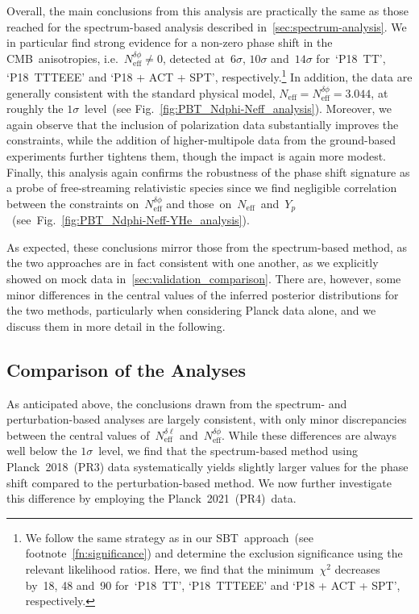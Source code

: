 \documentclass[11pt]{article}
\numberwithin{equation}{section}
\newcommand{\Neff}{N_\mathrm{eff}}
\newcommand{\Nphase}{N_\mathrm{eff}^{\delta\phi}}
\newcommand{\Nmultipole}{N_\mathrm{eff}^{\delta\ell}}
\begin{document}
Overall, the main conclusions from this analysis are practically the same as those reached for the spectrum-based analysis described in~\textsection\ref{sec:spectrum-analysis}. We in particular find strong evidence for a non-zero phase shift in the CMB~anisotropies, i.e.\ $\Nphase \neq 0$, detected at~$6\sigma$, $10\sigma$ and~$14\sigma$ for~`P18~TT', `P18~TTTEEE' and `P18 + ACT + SPT', respectively.\footnote{We follow the same strategy as in our SBT~approach~(see footnote~\ref{fn:significance}) and determine the exclusion significance using the relevant likelihood ratios. Here, we find that the minimum~$\chi^2$ decreases by~18, 48 and~90 for~`P18~TT', `P18~TTTEEE' and `P18 + ACT + SPT', respectively.} In addition, the data are generally consistent with the standard physical model, $\Neff = \Nphase = 3.044$, at roughly the $1\sigma$~level~(see Fig.~\ref{fig:PBT_Ndphi-Neff_analysis}). Moreover, we again observe that the inclusion of polarization data substantially improves the constraints, while the addition of higher-multipole data from the ground-based experiments further tightens them, though the impact is again more modest. Finally, this analysis again confirms the robustness of the phase shift signature as a probe of free-streaming relativistic species since we find negligible correlation between the constraints on~$\Nphase$ and \mbox{those on~$\Neff$ and~$Y_p$~(see Fig.~\ref{fig:PBT_Ndphi-Neff-YHe_analysis}).}

As expected, these conclusions mirror those from the spectrum-based method, as the two approaches are in fact consistent with one another, as we explicitly showed on mock data in~\textsection\ref{sec:validation_comparison}. There are, however, some minor differences in the central values of the inferred posterior distributions for the two methods, particularly when considering Planck data alone, and we discuss them in more detail in the following.


\subsection{Comparison of the Analyses}
\label{sec:comparison-data}

As anticipated above, the conclusions drawn from the spectrum- and perturbation-based analyses are largely consistent, with only minor discrepancies between the central values of~$\Nmultipole$ and~$\Nphase$. While these differences are always well below the $1\sigma$~level, we find that the spectrum-based method using Planck~2018~(PR3) data systematically yields slightly larger values for the phase shift compared to the perturbation-based method. We now further investigate this difference by employing the Planck~2021~(PR4)~data.\medskip
\end{document}
